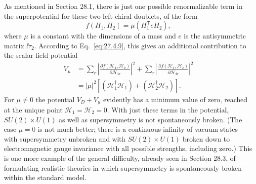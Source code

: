 As mentioned in Section 28.1, there is just one possible renormalizable
term in the superpotential for these two left-chiral doublets, of the form
\begin{equation}
  f(H_1,H_2)=\mu\left(H_1^{\mathsf T}eH_2\right),
  \tag{28.5.7}\label{eq:28.5.7}
\end{equation}
where \(\mu\) is a constant with the dimensions of a mass and \(e\) is the
antisymmetric matrix \(\ii\tau_2\). According to Eq.~\eqref{eq:27.4.9},
this gives an additional contribution to the scalar field potential
\begin{equation}
  \begin{aligned}
  V_\mu
  &=
    \sum_r\left|
      \frac{\partial f(\mathcal{H}_1,\mathcal{H}_2)}
           {\partial\mathcal{H}_{1r}}
    \right|^2
    +\sum_r\left|
      \frac{\partial f(\mathcal{H}_1,\mathcal{H}_2)}
           {\partial\mathcal{H}_{2r}}
    \right|^2\\
  &=|\mu|^2
    \left[
      \left(\mathcal{H}_1^\dagger\mathcal{H}_1\right)
      +\left(\mathcal{H}_2^\dagger\mathcal{H}_2\right)
    \right].
  \end{aligned}
  \tag{28.5.8}\label{eq:28.5.8}
\end{equation}
For \(\mu\neq0\) the potential \(V_D+V_\mu\) evidently has a minimum value
of zero, reached at the unique point
\(\mathcal{H}_1=\mathcal{H}_2=0\). With just these terms in the potential,
\(SU(2)\times U(1)\) as well as supersymmetry is not spontaneously
broken. (The case \(\mu=0\) is not much better; there is a continuous
infinity of vacuum states with supersymmetry unbroken and with
\(SU(2)\times U(1)\) broken down to electromagnetic gauge
invariance with all possible strengths, including zero.) This is one more
example of the general difficulty, already seen in Section 28.3, of
formulating realistic theories in which supersymmetry is spontaneously
broken within the standard model.

